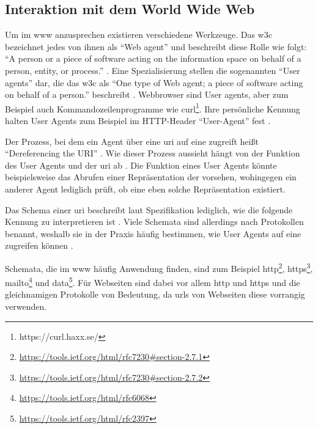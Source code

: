     \subsection{Interaktion mit dem World Wide Web}
        Um {\resources} im \gls{www} anzusprechen existieren verschiedene Werkzeuge.
        Das \gls{w3c} bezeichnet jedes von ihnen als
        "`Web agent"' und beschreibt diese Rolle wie folgt:
        "`A person or a piece of software acting on the information
        space on behalf of a person, entity, or process."' \cite[Kapitel 6]{w3c:wwwArch}.
        Eine Spezialisierung stellen die sogenannten "`User agents"' dar,
        die das \gls{w3c} als "`One type of Web agent;
        a piece of software acting on behalf of a person."' beschreibt \cite[Kapitel 6]{w3c:wwwArch}.
        Webbrowser sind User agents, aber zum Beispiel auch Kommandozeilenprogramme
        wie curl\footnote{https://curl.haxx.se/}.
        Ihre persönliche Kennung halten User Agents zum Beispiel im
        HTTP-Header "`User-Agent"' fest \cite[Kapitel 5.5.3, Seite 46]{rfc:7231}.

        Der Prozess, bei dem ein Agent über eine \gls{uri} auf eine {\resource}
        zugreift heißt "`Dereferencing the URI"' \cite[Kapitel 3.1]{w3c:wwwArch}.
        Wie dieser Prozess aussieht hängt von der Funktion des User Agents und der \gls{uri} ab
        \cite[Kapitel 3.1]{w3c:wwwArch}.
        Die Funktion eines User Agents könnte beispielsweise das Abrufen einer
        Repräsentation der {\resource} vorsehen, wohingegen ein anderer Agent
        lediglich prüft, ob eine eben solche Repräsentation existiert.

        Das Schema einer \gls{uri} beschreibt laut Spezifikation
        lediglich, wie die folgende Kennung zu interpretieren ist
        \cite[Kapitel 3.1, Seite 17]{rfc:3986}.
        Viele Schemata sind allerdings nach Protokollen benannt,
        weshalb sie in der Praxis häufig bestimmen,
        wie User Agents auf eine {\resource} zugreifen können
        \cite[Kapitel 3.1]{w3c:wwwArch}.
        
        Schemata, die im \gls{www} häufig Anwendung finden,
        sind zum Beispiel
        http\footnote{\url{https://tools.ietf.org/html/rfc7230\#section-2.7.1}},
        https\footnote{\url{https://tools.ietf.org/html/rfc7230\#section-2.7.2}},
        mailto\footnote{\url{https://tools.ietf.org/html/rfc6068}} und
        data\footnote{\url{https://tools.ietf.org/html/rfc2397}}.
        Für Webseiten sind dabei vor allem http und https
        und die gleichnamigen Protokolle von Bedeutung,
        da \glspl{url} von Webseiten diese vorrangig verwenden.

